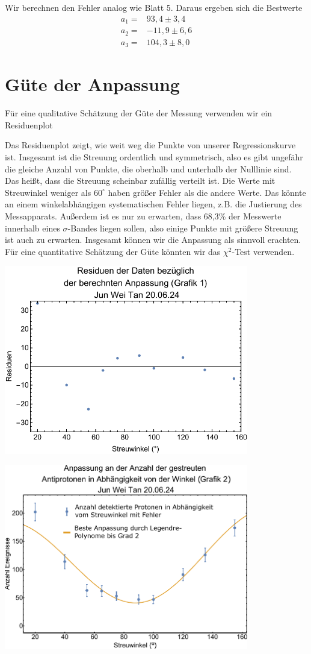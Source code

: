 \documentclass[prb,12pt]{revtex4-2}
\theoremstyle{definition}
\theoremstyle{definition}
\begin{document}
Wir berechnen den Fehler analog wie Blatt 5. Daraus ergeben sich die Bestwerte
\begin{align*}
	a_1=&93,4\pm 3,4\\
	a_2=&-11,9\pm 6,6\\
	a_3=&104,3\pm 8,0
\end{align*}
\section{Güte der Anpassung}
Für eine qualitative Schätzung der Güte der Messung verwenden wir ein Residuenplot


Das Residuenplot zeigt, wie weit weg die Punkte von unserer Regressionskurve ist. Insgesamt ist die Streuung ordentlich und symmetrisch, also es gibt ungefähr die gleiche Anzahl von Punkte, die oberhalb und unterhalb der Nulllinie sind. Das heißt, dass die Streuung scheinbar zufällig verteilt ist. Die Werte mit Streuwinkel weniger als $60^\circ$ haben größer Fehler als die andere Werte. Das könnte an einem winkelabhängigen systematischen Fehler liegen, z.B. die Justierung des Messapparats. Außerdem ist es nur zu erwarten, dass 68,3\% der Messwerte innerhalb eines $\sigma$-Bandes liegen sollen, also einige Punkte mit größere Streuung ist auch zu erwarten. Insgesamt können wir die Anpassung als sinnvoll erachten. Für eine quantitative Schätzung der Güte könnten wir das $\chi^2$-Test verwenden. 

\begin{center}
	\includegraphics[width=0.8\textwidth]{plt2.pdf}
\end{center}
\begin{center}
	\includegraphics[width=0.8\textwidth]{fig.pdf}
\end{center}
\end{document}

